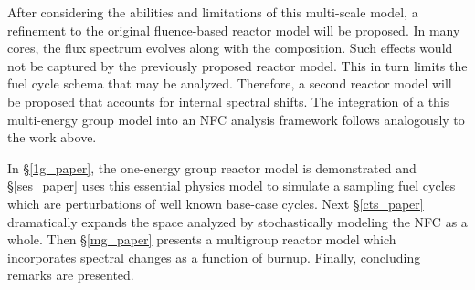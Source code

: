 After considering the abilities and limitations of this multi-scale model, a refinement to 
the original fluence-based reactor model will be proposed.  In many cores, the flux spectrum
evolves along with the composition.  Such effects would not be captured by the previously 
proposed reactor model.  This in turn limits the fuel cycle schema that may be analyzed.
Therefore, a second reactor model will be proposed that accounts for internal spectral shifts.
The integration of a this multi-energy group model into an NFC analysis framework follows
analogously to the work above.

In \S \ref{1g_paper}, the one-energy group reactor model is demonstrated and \S \ref{ses_paper}
uses this essential physics model to simulate a sampling fuel cycles which are perturbations of 
well known base-case cycles.  Next \S \ref{cts_paper} dramatically
expands the space analyzed by stochastically 
modeling the NFC as a whole. Then \S \ref{mg_paper} presents a multigroup reactor
model which incorporates spectral changes as a function of burnup.  Finally, concluding remarks
are presented.


